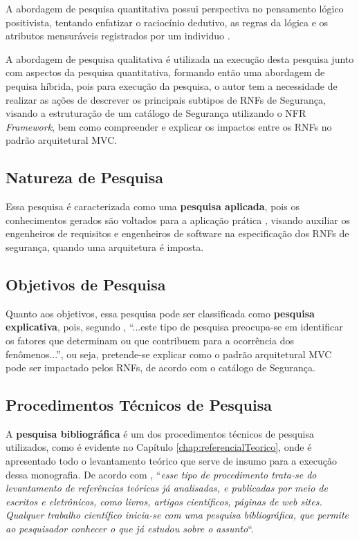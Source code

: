 A abordagem de pesquisa quantitativa possui perspectiva no pensamento lógico positivista, tentando enfatizar o raciocínio dedutivo, as regras da lógica e os atributos mensuráveis registrados por um individuo \cite{gerhardt2009metodos}. 

A abordagem de pesquisa qualitativa é utilizada na execução desta pesquisa junto com aspectos da pesquisa quantitativa, formando então uma abordagem de pequisa híbrida, pois para execução da pesquisa, o autor tem a necessidade de realizar as ações de descrever os principais subtipos de RNFs de Segurança, visando a estruturação de um catálogo de Segurança utilizando o NFR \textit{Framework}, bem como compreender e explicar os impactos entre os RNFs no padrão arquitetural MVC.  

\subsection{Natureza de Pesquisa}
\label{sub:naturezaDePesquisa}

Essa pesquisa é caracterizada como uma \textbf{pesquisa aplicada}, pois os conhecimentos gerados são voltados para a aplicação prática \cite{gerhardt2009metodos}, visando auxiliar os engenheiros de requisitos e engenheiros de software na especificação dos RNFs de segurança, quando uma arquitetura é imposta. 

\subsection{Objetivos de Pesquisa}
\label{sub:objetivosDePesquisa}

Quanto aos objetivos, essa pesquisa pode ser classificada como \textbf{pesquisa explicativa}, pois, segundo \cite{gil2002elaborar}, “...este tipo de pesquisa preocupa-se em identificar os fatores que determinam ou que contribuem para a ocorrência dos fenômenos...”, ou seja, pretende-se explicar como o padrão arquitetural MVC pode ser impactado pelos RNFs, de acordo com o catálogo de Segurança.

\subsection{Procedimentos Técnicos de Pesquisa}
\label{sub:procedimentosDePesquisa}

A \textbf{pesquisa bibliográfica} é um dos procedimentos técnicos de pesquisa utilizados, como é evidente no Capítulo \ref{chap:referencialTeorico}, onde é apresentado todo o levantamento teórico que serve de insumo para a execução dessa monografia. De acordo com \cite[p.35]{fonseca2002metodologia}, “\textit{esse tipo de procedimento trata-se do levantamento de referências teóricas já analisadas, e publicadas por meio de escritos e eletrônicos, como livros, artigos científicos, páginas de web sites. Qualquer trabalho científico inicia-se com uma pesquisa bibliográfica, que permite ao pesquisador conhecer o que já estudou sobre o assunto}“.
 
